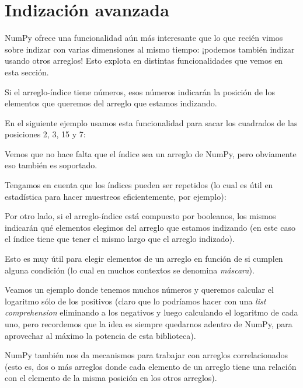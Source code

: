 \section{Indización avanzada}

NumPy ofrece una funcionalidad aún más interesante que lo que recién vimos sobre indizar con varias dimensiones al mismo tiempo: ¡podemos también indizar usando otros arreglos! Esto explota en distintas funcionalidades que vemos en esta sección.

Si el arreglo-índice tiene números, esos números indicarán la posición de los elementos que queremos del arreglo que estamos indizando.

En el siguiente ejemplo usamos esta funcionalidad para sacar los cuadrados de las posiciones 2, 3, 15 y 7:


Vemos que no hace falta que el índice sea un arreglo de NumPy, pero obviamente eso también es soportado.

Tengamos en cuenta que los índices pueden ser repetidos (lo cual es útil en estadística para hacer muestreos eficientemente, por ejemplo):


Por otro lado, si el arreglo-índice está compuesto por booleanos, los mismos indicarán qué elementos elegimos del arreglo que estamos indizando (en este caso el índice tiene que tener el mismo largo que el arreglo indizado).


Esto es muy útil para elegir elementos de un arreglo en función de si cumplen alguna condición (lo cual en muchos contextos se denomina \emph{máscara}).

Veamos un ejemplo donde tenemos muchos números y queremos calcular el logaritmo sólo de los positivos (claro que lo podríamos hacer con una \textit{list comprehension} eliminando a los negativos y luego calculando el logaritmo de cada uno, pero recordemos que la idea es siempre quedarnos adentro de NumPy, para aprovechar al máximo la potencia de esta biblioteca).


NumPy también nos da mecanismos para trabajar con arreglos correlacionados (esto es, dos o más arreglos donde cada elemento de un arreglo tiene una relación con el elemento de la misma posición en los otros arreglos).

